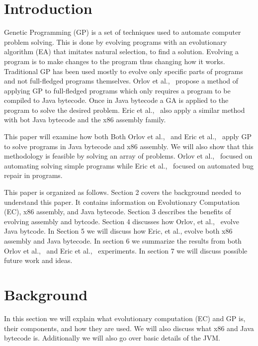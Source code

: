 \documentclass{sig-alternate}
\begin{document}

\section{Introduction}
Genetic Programming (GP) is a set of techniques used to automate computer problem solving. This is done by evolving programs with an evolutionary algorithm (EA) that imitates natural selection, to find a solution. Evolving a program is to make changes to the program thus changing how it works. Traditional GP has been used mostly to evolve only specific parts of programs and not full-fledged programs themselves. Orlov et al.,~\cite{FINCH2:2009} propose a method of applying GP to full-fledged programs which only requires a program to be compiled to Java bytecode. Once in Java bytecode a GA is applied to the program to solve the desired problem. Eric et al.,~\cite{Assembly:2010} also apply a similar method with bot Java bytecode and the x86 assembly family.\par
	This paper will examine how both Both Orlov et al.,~\cite{FINCH:2011} and Eric et al.,~\cite{Assembly:2010} apply GP to solve programs in Java bytecode and x86 assembly. We will also show that this methodology is feasible by solving an array of problems. Orlov et al.,~\cite{FINCH:2011} focused on automating solving simple programs while Eric et al.,~\cite{Assembly:2010} focused on automated bug repair in programs. 
	
This paper is organized as follows. Section 2 covers the background needed to understand this paper. It contains information on Evolutionary Computation (EC), x86 assembly, and Java bytecode. Section 3 describes the benefits of evolving assembly and bytcode. Section 4 discusses how Orlov, et al.,~\cite{FINCH:2011} evolve Java bytcode. In Section 5  we will discuss how Eric, et al., evolve both x86 assembly and Java bytecode. In section 6 we summarize the results from both Orlov et al.,~\cite{FINCH:2011} and Eric et al.,~\cite{Assembly:2010} experiments. In section 7 we will discuss possible future work and ideas.
	
	

\section{Background}


In this section we will explain what evolutionary computation (EC) and GP is, their components, and how they are used.
We will also discuss what x86 and Java bytecode is. Additionally we will also go over basic details of the JVM.
\end{document}
